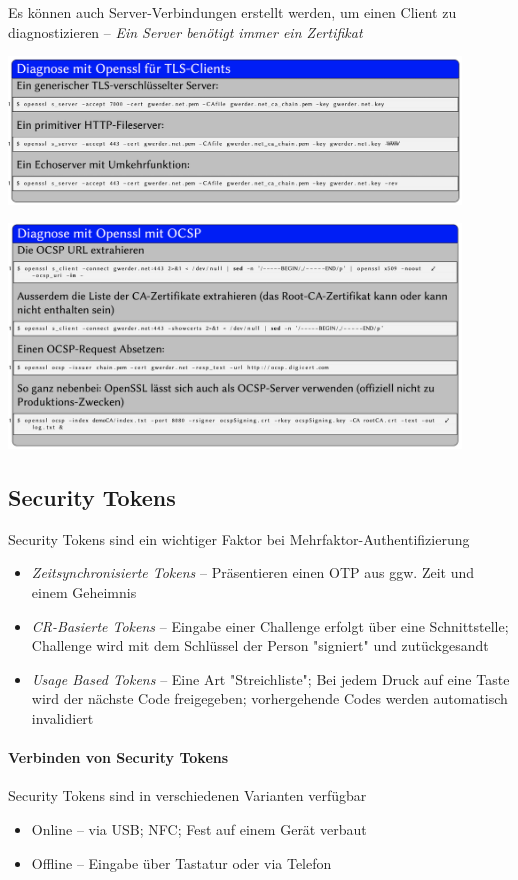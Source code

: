 \documentclass[a4paper,12pt]{article}
\begin{document}
Es können auch Server-Verbindungen erstellt werden, um einen Client zu diagnostizieren -- \emph{Ein Server benötigt immer ein Zertifikat}

\begin{center}
\includegraphics[width=12cm]{img/05_openssl_2.png}
\end{center}
\begin{center}
\includegraphics[width=12cm]{img/05_openssl_3.png}
\end{center}

\subsection{Security Tokens}
Security Tokens sind ein wichtiger Faktor bei Mehrfaktor-Authentifizierung

\begin{itemize}
\item \emph{Zeitsynchronisierte Tokens} -- Präsentieren einen OTP aus ggw. Zeit und einem Geheimnis
\item \emph{CR-Basierte Tokens} -- Eingabe einer Challenge erfolgt über eine Schnittstelle; Challenge wird mit dem Schlüssel der Person "signiert" und zutückgesandt
\item \emph{Usage Based Tokens} -- Eine Art "Streichliste"; Bei jedem Druck auf eine Taste wird der nächste Code freigegeben; vorhergehende Codes werden automatisch invalidiert
\end{itemize}

\paragraph{Verbinden von Security Tokens}
Security Tokens sind in verschiedenen Varianten verfügbar
\begin{itemize}
\item Online -- via USB; NFC; Fest auf einem Gerät verbaut
\item Offline -- Eingabe über Tastatur oder via Telefon
\end{itemize}
\end{document}
